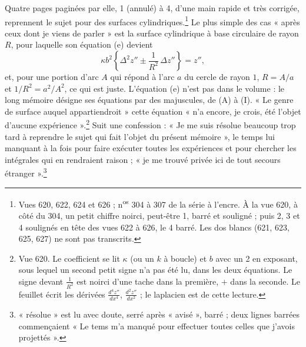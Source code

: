 \documentclass[11pt,a4paper]{article}
\begin{document}
Quatre pages paginées par elle, 1 (annulé) à 4, d'une main rapide et très corrigée,
reprennent le sujet pour des surfaces cylindriques.\footnote{Vues 620, 622, 624 et
626 ; n\textsuperscript{os} 304 à 307 de la série à l'encre. À la vue 620, à côté du
304, un petit chiffre noirci, peut-être 1, barré et souligné ; puis 2, 3 et 4 soulignés
en tête des vues 622 à 626, le 4 barré. Les dos blancs (621, 623, 625, 627) ne sont
pas transcrits.} Le plus simple des cas « après ceux dont je viens de parler » est la
surface cylindrique à base circulaire de rayon $R$, pour laquelle son équation (e)
devient
\[
\kappa b^{2}\left\{\Delta^2 z'' \pm \frac{1}{R^2}\,\Delta z''\right\} = z'' ,
\]
et, pour une portion d'arc $A$ qui répond à l'arc $a$ du cercle de rayon $1$,
$R = A/a$ et $1/R^2 = a^2/A^2$, ce qui est juste. L'équation (e) n'est pas dans le
volume : le long mémoire désigne ses équations par des majuscules, de (A) à (I).
« Le genre de surface auquel appartiendroit » cette équation « n'a encore, je crois,
été l'objet d'aucune expérience ».\footnote{Vue 620. Le coefficient se lit $\kappa$
(ou un $k$ à boucle) et $b$ avec un 2 en exposant, sous lequel un second petit signe
n'a pas été lu, dans les deux équations. Le signe devant $\frac{1}{R^2}$ est noirci
d'une tache dans la première, $+$ dans la seconde. Le feuillet écrit les dérivées
$\frac{d^4z''}{dx^4}$, $\frac{d^2z''}{dx^2}$ ; le laplacien est de cette lecture.}
Suit une confession : « Je me suis résolue beaucoup trop tard à reprendre le sujet qui
fait l'objet du présent mémoire », le temps lui manquant à la fois pour faire exécuter
toutes les expériences et pour chercher les intégrales qui en rendraient raison ;
« je me trouvé privée ici de tout secours étranger ».\footnote{« résolue » est lu avec
doute, serré après « avisé », barré ; deux lignes barrées commençaient « Le tems m'a
manqué pour effectuer toutes celles que j'avois projettés ».}
\end{document}
